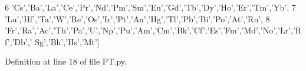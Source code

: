 \begin{DoxyCode}
6             \textcolor{stringliteral}{'Cs'},\textcolor{stringliteral}{'Ba'},\textcolor{stringliteral}{'La'},\textcolor{stringliteral}{'Ce'},\textcolor{stringliteral}{'Pr'},\textcolor{stringliteral}{'Nd'},\textcolor{stringliteral}{'Pm'},\textcolor{stringliteral}{'Sm'},\textcolor{stringliteral}{'Eu'},\textcolor{stringliteral}{'Gd'},\textcolor{stringliteral}{'Tb'},\textcolor{stringliteral}{'Dy'},\textcolor{stringliteral}{'Ho'},\textcolor{stringliteral}{'Er'},\textcolor{stringliteral}{'Tm'},\textcolor{stringliteral}{'Yb'},
7             \textcolor{stringliteral}{'Lu'},\textcolor{stringliteral}{'Hf'},\textcolor{stringliteral}{'Ta'},\textcolor{stringliteral}{'W'},\textcolor{stringliteral}{'Re'},\textcolor{stringliteral}{'Os'},\textcolor{stringliteral}{'Ir'},\textcolor{stringliteral}{'Pt'},\textcolor{stringliteral}{'Au'},\textcolor{stringliteral}{'Hg'},\textcolor{stringliteral}{'Tl'},\textcolor{stringliteral}{'Pb'},\textcolor{stringliteral}{'Bi'},\textcolor{stringliteral}{'Po'},\textcolor{stringliteral}{'At'},\textcolor{stringliteral}{'Rn'},
8             \textcolor{stringliteral}{'Fr'},\textcolor{stringliteral}{'Ra'},\textcolor{stringliteral}{'Ac'},\textcolor{stringliteral}{'Th'},\textcolor{stringliteral}{'Pa'},\textcolor{stringliteral}{'}\textcolor{stringliteral}{U','}Np','Pu','Am','Cm','Bk','Cf','Es','Fm','Md','No','Lr','Rf','Db','
      Sg','Bh','Hs','Mt']
\end{DoxyCode}


Definition at line 18 of file P\-T.\-py.

